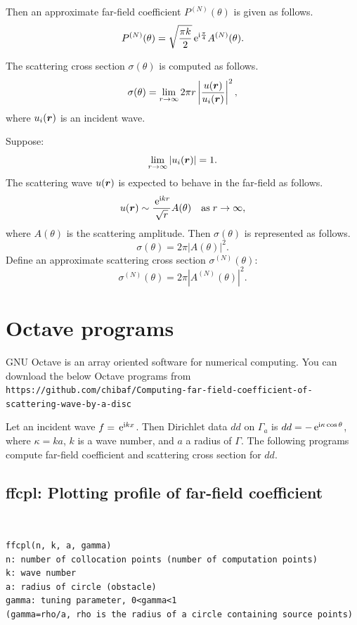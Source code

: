 \documentclass[12pt]{article}
\def\e{ \,{\rm e}}
\def\bfvec#1{\mbox{\boldmath$#1$}}
\begin{document}
Then an approximate far-field coefficient\cite{Bowman-Senior-Uslenghi} $P^{(N)}(\theta)$ is given as follows.
\begin{displaymath}
P^{(N)}(\theta)=\sqrt{\frac{\pi k}{2}}\e^{\mathrm{i}\frac{\pi}{4}} A^{(N)}(\theta).
\end{displaymath}

The scattering cross section $\sigma(\theta)$ is computed as follows\cite{Bowman-Senior-Uslenghi}.
\begin{displaymath}
\sigma(\theta)=\lim_{r\rightarrow\infty}2\pi r \left|\frac{u(\bfvec{r})}{u_i(\bfvec{r})}\right|^2,
\end{displaymath}
where $u_i(\bfvec{r})$ is an incident wave.

Suppose:
\begin{displaymath}
\lim_{r\rightarrow\infty}|u_i(\bfvec{r})|=1.
\end{displaymath}
The scattering wave $u(\bfvec{r})$ is expected to behave in the far-field as follows.
\begin{displaymath}
u(\bfvec{r}) \sim \frac{\e^{\mathrm{i}kr}}{\sqrt{r}}A(\theta) \quad {\rm as}\;r\rightarrow\infty,
\end{displaymath}
where $A(\theta)$ is the scattering amplitude.
Then $\sigma(\theta)$ is represented as follows.
\begin{displaymath}
\sigma(\theta)=2\pi |A(\theta)|^2.
\end{displaymath}
Define an approximate scattering cross section $\sigma^{(N)}(\theta)$:
\begin{displaymath}
\sigma^{(N)}(\theta)=2\pi |A^{(N)}(\theta)|^2.
\end{displaymath}


\section{Octave programs}
GNU Octave is an array oriented software for numerical computing\cite{eaton}. 
You can download the below Octave programs from \\
{\tt https://github.com/chibaf/Computing-far-field-coefficient-of-scattering-wave-by-a-disc}

Let an incident wave $f=\e^{\mathrm{i}kx}$. Then Dirichlet data $dd$ on $\Gamma_a$ is $dd=-\e^{\mathrm{i}\kappa\cos\theta}$, where $\kappa=k a$, $k$ is a wave number, and $a$ a radius of $\Gamma$.
The following programs compute far-field coefficient and scattering cross section for $dd$.

\subsection{ffcpl: Plotting profile of far-field coefficient}
{\tt
\begin{verbatim}
ffcpl(n, k, a, gamma)
n: number of collocation points (number of computation points)
k: wave number
a: radius of circle (obstacle)
gamma: tuning parameter, 0<gamma<1
(gamma=rho/a, rho is the radius of a circle containing source points)
\end{verbatim}
}
\end{document}
